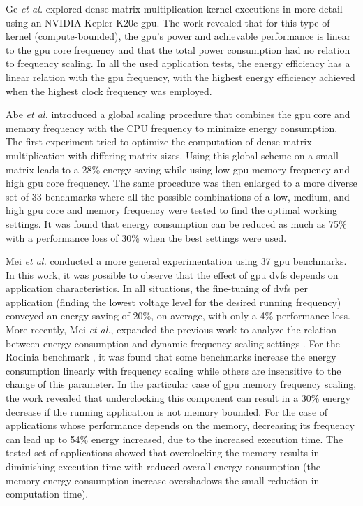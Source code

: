 Ge \textit{et al.} \cite{ge_effects_2013} explored dense matrix multiplication kernel executions in more detail using an NVIDIA Kepler K20c \acrshort{gpu}.  The work revealed that for this type of kernel (compute-bounded), the \acrshort{gpu}'s power and achievable performance is linear to the \acrshort{gpu} core frequency and that the total power consumption had no relation to frequency scaling. In all the used application tests, the energy efficiency has a linear relation with the \acrshort{gpu} frequency, with the highest energy efficiency achieved when the highest clock frequency was employed.

Abe \textit{et al.} \cite{abe_power_2012} introduced a global scaling procedure that combines the \acrshort{gpu} core and memory frequency with the CPU frequency to minimize energy consumption. The first experiment tried to optimize the computation of dense matrix multiplication with differing matrix sizes. Using this global scheme on a small matrix leads to a 28\% energy saving while using low \acrshort{gpu} memory frequency and high \acrshort{gpu} core frequency. The same procedure was then enlarged to a more diverse set of 33 benchmarks where all the possible combinations of a low, medium, and high \acrshort{gpu} core and memory frequency were tested to find the optimal working settings. It was found that energy consumption can be reduced as much as 75\% with a performance loss of 30\% when the best settings were used. 

Mei \textit{et al.} \cite{mei_measurement_2013} conducted a more general experimentation using 37 \acrshort{gpu} benchmarks. In this work, it was possible to observe that the effect of \acrshort{gpu} \acrshort{dvfs} depends on application characteristics. In all situations, the fine-tuning of \acrshort{dvfs} per application (finding the lowest voltage level for the desired running frequency) conveyed an energy-saving of 20\%, on average, with only a 4\% performance loss. More recently, Mei  \textit{et al.}, expanded the previous work to analyze the relation between energy consumption and dynamic frequency scaling settings \cite{mei_survey_2016}. For the  Rodinia benchmark \cite{che_rodinia:_2009}, it was found that some benchmarks increase the energy consumption linearly with frequency scaling while others are insensitive to the change of this parameter. In the particular case of \acrshort{gpu} memory frequency scaling, the work revealed that underclocking this component can result in a 30\% energy decrease if the running application is not memory bounded. For the case of applications whose performance depends on the memory, decreasing its frequency can lead up to 54\% energy increased, due to the increased execution time. The tested set of applications showed that overclocking the memory results in diminishing execution time with reduced overall energy consumption (the memory energy consumption increase overshadows the small reduction in computation time). 

